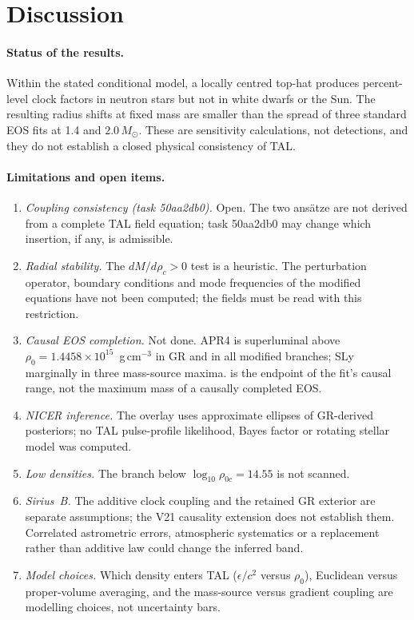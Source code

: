 \documentclass[11pt,a4paper]{article}
\newcommand{\Msun}{M_\odot}
\newcommand{\ee}[2]{#1\times10^{#2}}
\begin{document}
\section{Discussion}
\paragraph{Status of the results.} Within the stated conditional model, a locally centred top-hat produces
percent-level clock factors in neutron stars but not in white dwarfs or the Sun. The resulting radius shifts at
fixed mass are smaller than the spread of three standard EOS fits at 1.4 and $2.0\,\Msun$. These are sensitivity
calculations, not detections, and they do not establish a closed physical consistency of TAL.

\paragraph{Limitations and open items.}
\begin{enumerate}[leftmargin=*,itemsep=2pt]
\item \emph{Coupling consistency (task 50aa2db0).} Open. The two ans\"atze are not derived from a complete TAL
field equation; task 50aa2db0 may change which insertion, if any, is admissible.
\item \emph{Radial stability.} The $dM/d\rho_c>0$ test is a heuristic. The perturbation operator, boundary
conditions and mode frequencies of the modified equations have not been computed; the 
fields must be read with this restriction.
\item \emph{Causal EOS completion.} Not done. APR4 is superluminal above $\rho_0=\ee{1.4458}{15}$~g\,cm$^{-3}$ in
GR and in all modified branches; SLy marginally in three mass-source maxima.  is the
endpoint of the fit's causal range, not the maximum mass of a causally completed EOS.
\item \emph{NICER inference.} The overlay uses approximate ellipses of GR-derived posteriors; no TAL
pulse-profile likelihood, Bayes factor or rotating stellar model was computed.
\item \emph{Low densities.} The branch below $\log_{10}\rho_{0c}=14.55$ is not scanned.
\item \emph{Sirius~B.} The additive clock coupling and the retained GR exterior are separate assumptions; the V21
causality extension does not establish them. Correlated astrometric errors, atmospheric systematics or a
replacement rather than additive law could change the inferred band.
\item \emph{Model choices.} Which density enters TAL ($\epsilon/c^2$ versus $\rho_0$), Euclidean versus
proper-volume averaging, and the mass-source versus gradient coupling are modelling choices, not uncertainty
bars.
\end{enumerate}
\end{document}
